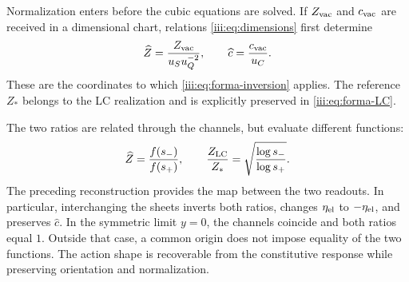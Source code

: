 Normalization enters before the cubic equations are solved.
If $Z_{\rm vac}$ and $c_{\rm vac}$ are received in a dimensional chart,
relations \eqref{iii:eq:dimensions} first determine
\[
 \widehat Z=\frac{Z_{\rm vac}}{u_Su_Q^{-2}},\qquad
 \widehat c=\frac{c_{\rm vac}}{u_C}.
\]
These are the coordinates to which
\eqref{iii:eq:forma-inversion} applies. The reference $Z_*$ belongs to the
LC realization and is explicitly preserved in \eqref{iii:eq:forma-LC}.

The two ratios are related through the channels, but evaluate
different functions:
\begin{equation}
 \widehat Z=\frac{f(s_-)}{f(s_+)},\qquad
 \frac{Z_{\rm LC}}{Z_*}
       =\sqrt{\frac{\log s_-}{\log s_+}}.
 \label{iii:eq:forma-dos-cocientes}
\end{equation}
The preceding reconstruction provides the map between the two readouts.
In particular, interchanging the sheets inverts both ratios, changes
$\eta_{\rm el}$ to $-\eta_{\rm el}$, and preserves $\widehat c$.
In the symmetric limit $y=0$, the channels coincide and both ratios
equal $1$. Outside that case, a common origin does not impose equality
of the two functions. The action shape is recoverable from the
constitutive response while preserving orientation and normalization.
